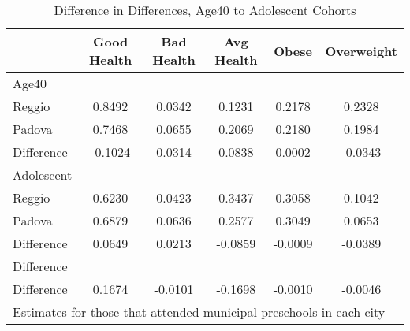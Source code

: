 \begin{table}[htbp]\centering
\caption{Difference in Differences, Age40 to Adolescent Cohorts}
\begin{tabular}{l*{5}{c}}
\hline\hline
            & Good Health&  Bad Health&  Avg Health&       Obese&  Overweight\\
\hline
Age40       &            &            &            &            &            \\
Reggio      &      0.8492&      0.0342&      0.1231&      0.2178&      0.2328\\
Padova      &      0.7468&      0.0655&      0.2069&      0.2180&      0.1984\\
Difference  &     -0.1024&      0.0314&      0.0838&      0.0002&     -0.0343\\
\hline
Adolescent  &            &            &            &            &            \\
Reggio      &      0.6230&      0.0423&      0.3437&      0.3058&      0.1042\\
Padova      &      0.6879&      0.0636&      0.2577&      0.3049&      0.0653\\
Difference  &      0.0649&      0.0213&     -0.0859&     -0.0009&     -0.0389\\
\hline
Difference  &            &            &            &            &            \\
Difference  &      0.1674&     -0.0101&     -0.1698&     -0.0010&     -0.0046\\
\hline\hline
\multicolumn{6}{l}{\footnotesize Estimates for those that attended municipal preschools in each city}\\
\end{tabular}
\end{table}
